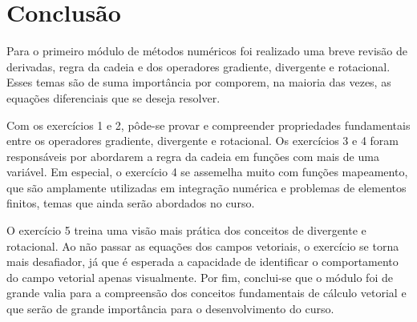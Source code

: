 \section{Conclus\~ao} 
Para o primeiro m\'odulo de m\'etodos num\'ericos foi realizado uma breve revis\~ao de derivadas, regra da cadeia e dos operadores gradiente, divergente e rotacional. Esses temas s\~ao de suma import\^ancia por comporem, na maioria das vezes, as equa\c{c}\~oes diferenciais que se deseja resolver. 

Com os exerc\'icios 1 e 2, p\^ode-se provar e compreender propriedades fundamentais entre os operadores gradiente, divergente e rotacional. Os exerc\'icios 3 e 4 foram respons\'aveis por abordarem a regra da cadeia em fun\c{c}\~oes com mais de uma vari\'avel. Em especial, o exerc\'icio 4 se assemelha muito com fun\c{c}\~oes mapeamento, que s\~ao amplamente utilizadas em integra\c{c}\~ao num\'erica e problemas de elementos finitos, temas que ainda ser\~ao abordados no curso.

O exerc\'icio 5 treina uma vis\~ao mais pr\'atica dos conceitos de divergente e rotacional. Ao n\~ao passar as equa\c{c}\~oes dos campos vetoriais, o exerc\'icio se torna mais desafiador, j\'a que \'e esperada a capacidade de identificar o comportamento do campo vetorial apenas visualmente. Por fim, conclui-se que o m\'odulo foi de grande valia para a compreens\~ao dos conceitos fundamentais de c\'alculo vetorial e que ser\~ao de grande import\^ancia para o desenvolvimento do curso.